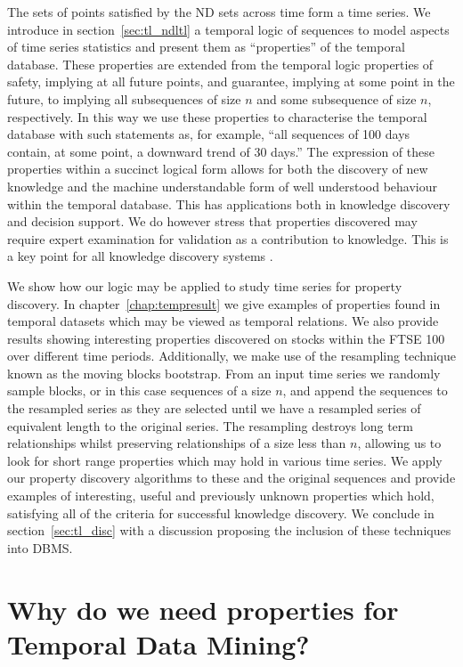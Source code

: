 \medskip

The sets of points satisfied by the ND sets across time form a time
series. We introduce in section~\ref{sec:tl_ndltl} a temporal logic of
sequences to model aspects of
time series statistics and present them as ``properties'' of the
temporal database. These properties are extended from the temporal
logic properties of safety, implying at all future points, and
guarantee, implying at some point in the future, to implying all
subsequences of size $n$ and some subsequence of size $n$, respectively.  
In this way we use these properties to characterise
the temporal database with such statements as, for example, ``all
sequences of 100 days contain, at some point, a downward trend of 30
days.'' The expression of these properties within a succinct logical
form allows for both the discovery of new knowledge and the machine
understandable form of well understood behaviour within the temporal
database. This has applications both in knowledge discovery and
decision support. We do however stress that properties discovered may
require expert examination for validation as a contribution to
knowledge. This is a key point for all knowledge discovery systems \cite{fps96,man97}.
\smallskip

We show how our logic may be applied to study time series for
property discovery. In chapter~\ref{chap:tempresult} we give examples
of properties found in temporal
datasets which may be viewed as temporal relations. We also provide
results showing interesting properties
discovered on stocks within the FTSE 100 over different
time periods. Additionally, we make use of the resampling technique
known as the moving blocks bootstrap. From an input time series we
randomly sample blocks, or in this case sequences of a size $n$, and
append the sequences to the resampled series as they are selected
until we have a resampled series of equivalent length to the original
series.  
The resampling destroys long term relationships whilst preserving
relationships of a size less than $n$, allowing us to
look for short range properties which may hold in various time series.
We apply our property discovery
algorithms to these and the original sequences and provide examples of
interesting,
useful and previously unknown properties which hold, satisfying all of
the criteria for successful knowledge discovery. We conclude in
section~\ref{sec:tl_disc} with a
discussion proposing the inclusion of these techniques into DBMS.

\section{Why do we need properties for Temporal Data Mining?}\label{sec:tl_why}

